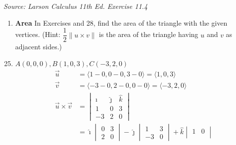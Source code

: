 \textit{Source: Larson Calculus 11th Ed. Exercise 11.4}

\begin{enumerate}[label={}, leftmargin=*]
    \item \textbf{Area} In Exercises and 28, find the area of the triangle with the given
          vertices. (Hint: $\dfrac{1}{2}\|u \times v\|$ is the area of the triangle
          having $u$ and $v$ as adjacent sides.)
\end{enumerate}
\begin{enumerate}
    \setcounter{enumi}{24}
    \item $A(0,0,0), B(1,0,3), C(-3,2,0)$
          \sol{}
          \begin{align*}
              \vec{u}                & = \langle 1 - 0, 0 - 0, 3 - 0 \rangle = \langle 1, 0, 3 \rangle                    \\
              \vec{v}                & = \langle -3 - 0, 2 - 0, 0 - 0 \rangle = \langle -3, 2, 0 \rangle                  \\
              \vec{u} \times \vec{v} & = \begin{vmatrix}
                                             \hat{\imath} & \hat{\jmath} & \hat{k} \\
                                             1            & 0            & 3       \\
                                             -3           & 2            & 0
                                         \end{vmatrix}                        \\
                                     & = \hat{\imath} \begin{vmatrix}
                                                          0 & 3 \\
                                                          2 & 0
                                                      \end{vmatrix} - \hat{\jmath} \begin{vmatrix}
                                                                                       1  & 3 \\
                                                                                       -3 & 0
                                                                                   \end{vmatrix} + \hat{k} \begin{vmatrix}
                                                                                                               1  & 0 \\

\end{vmatrix}
\end{align*}
\end{enumerate}
